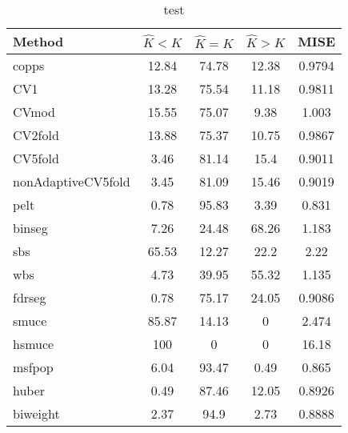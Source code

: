 \begin{table}[ht]
\centering
\begin{tabular}{l|cccc}
  \hline
Method & $\hat{K} < K$ & $\hat{K} = K$ & $\hat{K} > K$ & MISE \\ 
  \hline
copps & 12.84 & 74.78 & 12.38 & 0.9794 \\ 
  CV1 & 13.28 & 75.54 & 11.18 & 0.9811 \\ 
  CVmod & 15.55 & 75.07 &  9.38 & 1.003 \\ 
  CV2fold & 13.88 & 75.37 & 10.75 & 0.9867 \\ 
  CV5fold &  3.46 & 81.14 &  15.4 & 0.9011 \\ 
  nonAdaptiveCV5fold &  3.45 & 81.09 & 15.46 & 0.9019 \\ 
  pelt &  0.78 & 95.83 &  3.39 & 0.831 \\ 
  binseg &  7.26 & 24.48 & 68.26 & 1.183 \\ 
  sbs & 65.53 & 12.27 &  22.2 &  2.22 \\ 
  wbs &  4.73 & 39.95 & 55.32 & 1.135 \\ 
  fdrseg &  0.78 & 75.17 & 24.05 & 0.9086 \\ 
  smuce & 85.87 & 14.13 &     0 & 2.474 \\ 
  hsmuce &   100 &     0 &     0 & 16.18 \\ 
  msfpop &  6.04 & 93.47 &  0.49 & 0.865 \\ 
  huber &  0.49 & 87.46 & 12.05 & 0.8926 \\ 
  biweight &  2.37 &  94.9 &  2.73 & 0.8888 \\ 
   \hline
\end{tabular}
\caption{test} 
\end{table}

